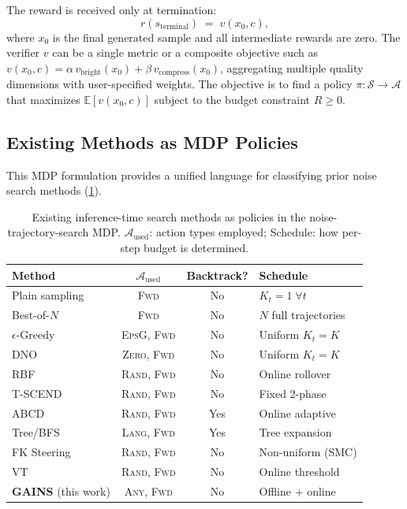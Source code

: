 The reward is received only at termination:
\[
  r(s_{\text{terminal}}) \;=\; v(x_0, c),
\]
where $x_0$ is the final generated sample and all intermediate rewards
are zero.
The verifier $v$ can be a single metric or a composite objective
such as $v(x_0, c) = \alpha\, v_{\text{bright}}(x_0)
+ \beta\, v_{\text{compress}}(x_0)$,
aggregating multiple quality dimensions with user-specified weights.
The objective is to find a policy
$\pi : \mathcal{S} \to \mathcal{A}$ that maximizes
$\mathbb{E}[v(x_0, c)]$ subject to the budget constraint $R \ge 0$.

\subsection{Existing Methods as MDP Policies}
\label{sec:mdp-policies}

This MDP formulation provides a unified language for classifying prior
noise search methods (\cref{tab:mdp_policies}).

\begin{table}[t]
\centering
\caption{Existing inference-time search methods as policies in the
noise-trajectory-search MDP.
$\mathcal{A}_{\text{used}}$: action types employed;
Schedule: how per-step budget is determined.}
\label{tab:mdp_policies}
\small
\begin{tabular}{lccl}
\toprule
\textbf{Method} & $\mathcal{A}_{\text{used}}$ &
\textbf{Backtrack?} & \textbf{Schedule} \\
\midrule
Plain sampling
  & \textsc{Fwd} & No & $K_t = 1\;\forall t$ \\
Best-of-$N$~\citep{ma2024inference}
  & \textsc{Fwd} & No & $N$ full trajectories \\
$\epsilon$-Greedy~\citep{ramesh2025nts}
  & \textsc{EpsG}, \textsc{Fwd} & No & Uniform $K_t = K$ \\
DNO~\citep{tang2024dno}
  & \textsc{Zero}, \textsc{Fwd} & No & Uniform $K_t = K$ \\
RBF~\citep{kim2025rbf}
  & \textsc{Rand}, \textsc{Fwd} & No & Online rollover \\
T-SCEND~\citep{zhang2025tscend}
  & \textsc{Rand}, \textsc{Fwd} & No & Fixed 2-phase \\
ABCD~\citep{lee2025abcd}
  & \textsc{Rand}, \textsc{Fwd} & Yes & Online adaptive \\
Tree/BFS~\citep{zhang2025classical}
  & \textsc{Lang}, \textsc{Fwd} & Yes & Tree expansion \\
FK Steering~\citep{singhal2025fk}
  & \textsc{Rand}, \textsc{Fwd} & No & Non-uniform (SMC) \\
VT~\citep{sundaresha2025vt}
  & \textsc{Rand}, \textsc{Fwd} & No & Online threshold \\
\midrule
\textbf{GAINS} (this work)
  & \textsc{Any}, \textsc{Fwd} & No &
  Offline + online \\
\bottomrule
\end{tabular}
\end{table}

